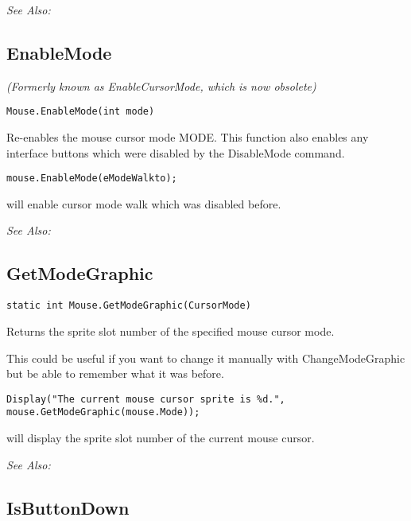 \it{See Also:} 


\subsection{EnableMode}\label{Mouse.EnableMode}%

\it{(Formerly known as EnableCursorMode, which is now obsolete)}

\begin{verbatim}
Mouse.EnableMode(int mode)
\end{verbatim}
Re-enables the mouse cursor mode MODE. This function also enables any
interface buttons which were disabled by the DisableMode command.

\begin{verbatim}
mouse.EnableMode(eModeWalkto);
\end{verbatim}
will enable cursor mode walk which was disabled before.

\it{See Also:} 


\subsection{GetModeGraphic}\label{Mouse.GetModeGraphic}%

\begin{verbatim}
static int Mouse.GetModeGraphic(CursorMode)
\end{verbatim}
Returns the sprite slot number of the specified mouse cursor mode.

This could be useful if you want to change it manually with ChangeModeGraphic but be able
to remember what it was before.

\begin{verbatim}
Display("The current mouse cursor sprite is %d.", mouse.GetModeGraphic(mouse.Mode));
\end{verbatim}
will display the sprite slot number of the current mouse cursor.

\it{See Also:} 


\subsection{IsButtonDown}\label{Mouse.IsButtonDown}%

